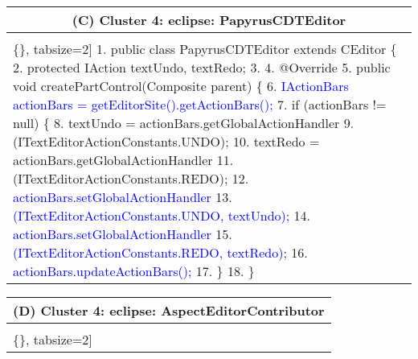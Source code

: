 \begin{figure*}[!htb]
%     
\begin{minipage}{0.5\textwidth}
\scriptsize 
\begin{tabular}{@{}p{}} 
 \hline 
  \multicolumn{1}{c}{(C) Cluster 4: eclipse: PapyrusCDTEditor} \\ \hline
  \vspace{-4mm}
\begin{Verbatim}[commandchars=\\\{\}, tabsize=2]
1. public class PapyrusCDTEditor extends CEditor \{
2.     protected IAction textUndo, textRedo;
3.    
4.   @Override
5.   public void createPartControl(Composite parent) \{
6. \textcolor{blue}{      IActionBars actionBars = getEditorSite().getActionBars();}
7.      if (actionBars != null) \{
8.          textUndo = actionBars.getGlobalActionHandler
9.            (ITextEditorActionConstants.UNDO);
10.        textRedo = actionBars.getGlobalActionHandler
11.	   (ITextEditorActionConstants.REDO);
12.\textcolor{blue}{	   actionBars.setGlobalActionHandler}
13.\textcolor{blue}{	     (ITextEditorActionConstants.UNDO, textUndo);}
14.\textcolor{blue}{   actionBars.setGlobalActionHandler}
15.\textcolor{blue}{     (ITextEditorActionConstants.REDO, textRedo);}
16.\textcolor{blue}{   actionBars.updateActionBars();}
17.     \} 
18.   \}
 \end{Verbatim}
      \vspace{-4mm}
  \\   
\end{tabular} 
\end{minipage}
 \begin{minipage}{0.5\textwidth}
\scriptsize 
\begin{tabular}{@{}p{}} 
 \hline 
  \multicolumn{1}{c}{(D) Cluster 4: eclipse: AspectEditorContributor} \\ \hline
  \vspace{-4mm}
\begin{Verbatim}[commandchars=\\\{\}, tabsize=2]

\end{Verbatim}
\end{tabular}
\end{minipage}
\end{figure*}

